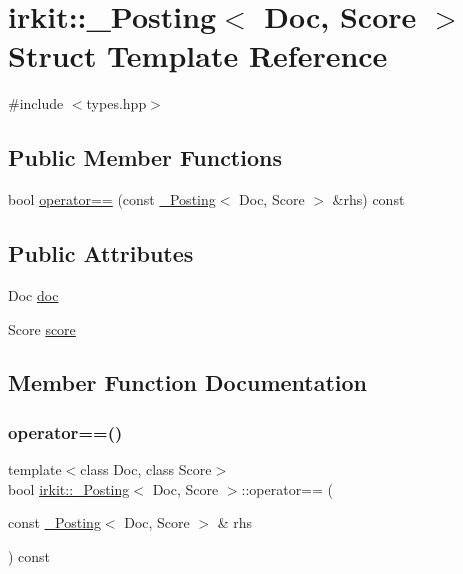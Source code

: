 \hypertarget{structirkit_1_1__Posting}{}\section{irkit\+:\+:\+\_\+\+Posting$<$ Doc, Score $>$ Struct Template Reference}
\label{structirkit_1_1__Posting}


{\ttfamily \#include $<$types.\+hpp$>$}

\subsection*{Public Member Functions}
\begin{DoxyCompactItemize}
\item 
bool \hyperlink{structirkit_1_1__Posting_a03d7cdeee582fa17a95ffb3615276d30}{operator==} (const \hyperlink{structirkit_1_1__Posting}{\+\_\+\+Posting}$<$ Doc, Score $>$ \&rhs) const
\end{DoxyCompactItemize}
\subsection*{Public Attributes}
\begin{DoxyCompactItemize}
\item 
Doc \hyperlink{structirkit_1_1__Posting_a6ee624b39c69f2b8701701ecc8fe6a0b}{doc}
\item 
Score \hyperlink{structirkit_1_1__Posting_a3c5cc3b179d8fb975d3356847e34955f}{score}
\end{DoxyCompactItemize}


\subsection{Member Function Documentation}
\mbox{\label{structirkit_1_1__Posting_a03d7cdeee582fa17a95ffb3615276d30}} 
\subsubsection{\texorpdfstring{operator==()}{operator==()}}
{\footnotesize\ttfamily template$<$class Doc, class Score$>$ \\
bool \hyperlink{structirkit_1_1__Posting}{irkit\+::\+\_\+\+Posting}$<$ Doc, Score $>$\+::operator== (\begin{DoxyParamCaption}\item[{const \hyperlink{structirkit_1_1__Posting}{\+\_\+\+Posting}$<$ Doc, Score $>$ \&}]{rhs }\end{DoxyParamCaption}) const\hspace{0.3cm}{\ttfamily [inline]}}



